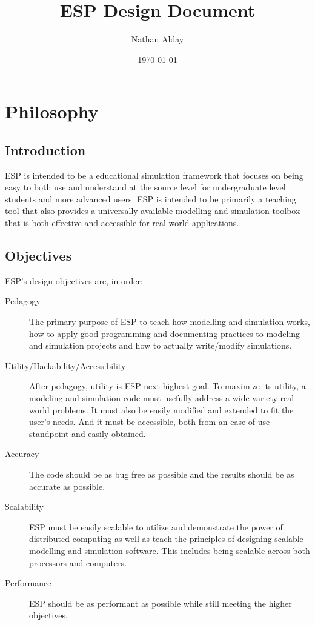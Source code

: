 \documentclass{book}
\begin{document}
\title{ESP Design Document}
\author{Nathan Alday}
\date{\today}
\maketitle

\chapter{Philosophy}
\section{Introduction}
ESP is intended to be a educational simulation framework that focuses on being easy to both use and understand at the source level for undergraduate level students and more advanced users. ESP is intended to be primarily a teaching tool that also provides a universally available modelling and simulation toolbox that is both effective and accessible for real world applications.

\section{Objectives}
ESP's design objectives are, in order:
\begin{description}
	\item[Pedagogy] The primary purpose of ESP to teach how modelling and simulation works, how to apply good programming and documenting practices to modeling and simulation projects and how to actually write/modify simulations.
	\item[Utility/Hackability/Accessibility] After pedagogy, utility is ESP next highest goal. To maximize its utility, a modeling and simulation code must usefully address a wide variety real world problems. It must also be easily modified and extended to fit the user's needs. And it must be accessible, both from an ease of use standpoint and easily obtained.
	\item[Accuracy] The code should be as bug free as possible and the results should be as accurate as possible.
	\item[Scalability] ESP must be easily scalable to utilize and demonstrate the power of distributed computing as well as teach the principles of designing scalable modelling and simulation software. This includes being scalable across both processors and computers.
	\item[Performance] ESP should be as performant as possible while still meeting the higher objectives.
\end{description}
\end{document}
